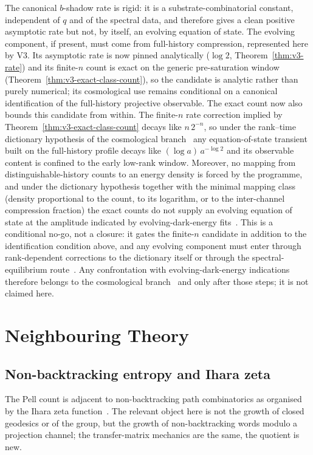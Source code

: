 \documentclass[11pt]{article}
\begin{document}
The canonical $b$-shadow rate is rigid: it is a substrate-combinatorial constant, independent of $q$ and of
the spectral data, and therefore gives a clean positive asymptotic rate but not, by itself, an evolving
equation of state.
The evolving component, if present, must come from full-history compression, represented here by V3.
Its asymptotic rate is now pinned analytically ($\log 2$, Theorem~\ref{thm:v3-rate}) and its finite-$n$
count is exact on the generic pre-saturation window (Theorem~\ref{thm:v3-exact-class-count}), so the
candidate is analytic rather than purely numerical; its cosmological use remains conditional on a canonical
identification of the full-history projective observable.
The exact count now also bounds this candidate from within.
The finite-$n$ rate correction implied by Theorem~\ref{thm:v3-exact-class-count} decays like $n\,2^{-n}$, so
under the rank--time dictionary hypothesis of the cosmological branch~\cite{Beau2026d} any equation-of-state
transient built on the full-history profile decays like $(\log a)\,a^{-\log 2}$ and its observable content
is confined to the early low-rank window.
Moreover, no mapping from distinguishable-history counts to an energy density is forced by the programme,
and under the dictionary hypothesis together with the minimal mapping class (density proportional to the
count, to its logarithm, or to the inter-channel compression fraction) the exact counts do not supply an
evolving equation of state at the amplitude indicated by evolving-dark-energy fits~\cite{DESI2024}.
This is a conditional no-go, not a closure: it gates the finite-$n$ candidate in addition to the
identification condition above, and any evolving component must enter through rank-dependent corrections to
the dictionary itself or through the spectral-equilibrium route~\cite{Beau2026Thermodynamics}.
Any confrontation with evolving-dark-energy indications therefore belongs to the cosmological
branch~\cite{Beau2026d} and only after those steps; it is not claimed here.

\section{Neighbouring Theory}
\label{sec:neighbouring}

\subsection{Non-backtracking entropy and Ihara zeta}
The Pell count is adjacent to non-backtracking path combinatorics as organised by the Ihara zeta
function~\cite{Ihara1966}.
The relevant object here is not the growth of closed geodesics or of the group, but the growth of
non-backtracking words modulo a projection channel; the transfer-matrix mechanics are the same, the quotient
is new.
\end{document}
